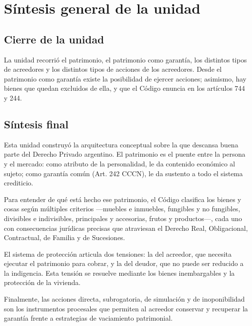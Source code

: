 \documentclass[12pt,oneside]{book}
\begin{document}
\chapter{Síntesis general de la unidad}

\section{Cierre de la unidad}

La unidad recorrió el patrimonio, el patrimonio como garantía, los distintos tipos de acreedores y los distintos tipos de acciones de los acreedores. Desde el patrimonio como garantía existe la posibilidad de ejercer acciones; asimismo, hay bienes que quedan excluidos de ella, y que el Código enuncia en los artículos 744 y 244.

\section{Síntesis final}

Esta unidad construyó la arquitectura conceptual sobre la que descansa buena parte del Derecho Privado argentino. El patrimonio es el puente entre la persona y el mercado: como atributo de la personalidad, le da contenido económico al sujeto; como garantía común (Art. 242 CCCN), le da sustento a todo el sistema crediticio.

Para entender de qué está hecho ese patrimonio, el Código clasifica los bienes y cosas según múltiples criterios ---muebles e inmuebles, fungibles y no fungibles, divisibles e indivisibles, principales y accesorias, frutos y productos---, cada uno con consecuencias jurídicas precisas que atraviesan el Derecho Real, Obligacional, Contractual, de Familia y de Sucesiones.

El sistema de protección articula dos tensiones: la del acreedor, que necesita ejecutar el patrimonio para cobrar, y la del deudor, que no puede ser reducido a la indigencia. Esta tensión se resuelve mediante los bienes inembargables y la protección de la vivienda.

Finalmente, las acciones directa, subrogatoria, de simulación y de inoponibilidad son los instrumentos procesales que permiten al acreedor conservar y recuperar la garantía frente a estrategias de vaciamiento patrimonial.
\end{document}
